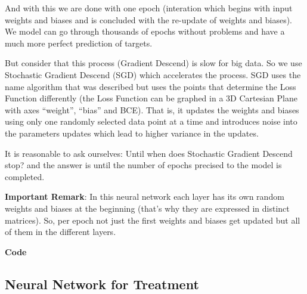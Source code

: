 \documentclass[12pt]{article}
\begin{document}
And with this we are done with one epoch (interation which begins with input weights and biases and is concluded with the re-update of weights and biases).
We model can go through thousands of epochs without problems and have a much more perfect prediction of targets.

But consider that this process (Gradient Descend) is slow for big data. So we use Stochastic Gradient Descend (SGD) which accelerates the process. SGD uses the
name algorithm that was described but uses the points that determine the Loss Function differently (the Loss Function can be graphed in a 3D Cartesian Plane with axes ``weight'', ``bias'' and BCE). That is, it updates the weights and biases using only one randomly selected data point at a time and
introduces noise into the parameters updates which lead to higher variance in the updates.

It is reasonable to ask ourselves: Until when does Stochastic Gradient Descend stop? and the answer is until the number of epochs precised to the model is completed.

\textbf{Important Remark}: In this neural network each layer has its own random weights and biases at the beginning (that's why they are expressed in distinct matrices). So, per epoch not just the first weights and biases get updated but all of them in the different layers.


\textbf{Code}



\subsection*{Neural Network for Treatment}
\end{document}

